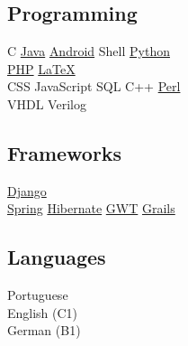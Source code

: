 \documentclass[]{willianpaixao-resume}
\begin{document}
\begin{minipage}[t]{0.35\textwidth}
\subsection{Programming}
C \textbullet
\href{https://www.oracle.com/java/}{Java} \textbullet{}
\href{http://android.com}{Android} \textbullet{}
Shell \textbullet{}
\href{http://www.python.org}{Python}\\
\href{http://www.php.net}{PHP} \textbullet{}
\href{http://www.latex-project.org}{\LaTeX} \\
CSS \textbullet{}
JavaScript \textbullet{}
SQL \textbullet{}
C++ \textbullet{}
\href{https://www.perl.org/}{Perl} \\
VHDL \textbullet{}
Verilog
\sectionsep

\subsection{Frameworks}
\href{https://www.djangoproject.com/}{Django} \\
\href{https://spring.io/}{Spring} \textbullet
\href{http://hibernate.org/}{Hibernate} \textbullet
\href{http://www.gwtproject.org/}{GWT} \textbullet
\href{https://grails.org/}{Grails}
\sectionsep

\subsection{Languages}
Portuguese \\
English (C1) \\
German (B1)


\end{minipage} 
\end{document}
